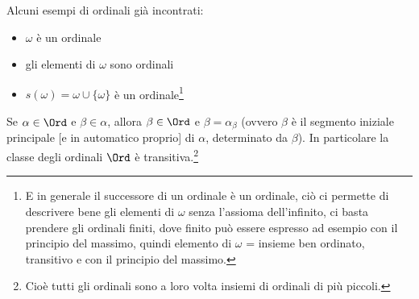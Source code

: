 \documentclass[11pt]{scrartcl}
\begin{document}
\begin{example}
	Alcuni esempi di ordinali già incontrati:
	\begin{itemize}
		\item $\omega$ è un ordinale
		\item gli elementi di $\omega$ sono ordinali
		\item $s(\omega) = \omega \cup \{\omega\}$ è un ordinale\footnote{E in generale il successore di un ordinale è un ordinale, ciò ci permette di descrivere bene gli elementi di $\omega$ senza l'assioma dell'infinito, ci basta prendere gli ordinali finiti, dove finito può essere espresso ad esempio con il principio del massimo,
		quindi elemento di $\omega$ = insieme ben ordinato, transitivo e con il principio del massimo.}
	\end{itemize}
\end{example}

\begin{remark}
	\label{Ord_trans}
	Se $\alpha \in \Ord$ e $\beta \in \alpha$, allora $\beta \in \Ord$ e $\beta = \alpha_\beta$ (ovvero $\beta$ è il segmento iniziale principale [e in automatico proprio] di $\alpha$, determinato da $\beta$). In particolare la classe degli ordinali $\Ord$ è transitiva.\footnote{Cioè tutti gli ordinali sono a loro volta insiemi di ordinali di più piccoli.}
\end{remark}
\end{document}
